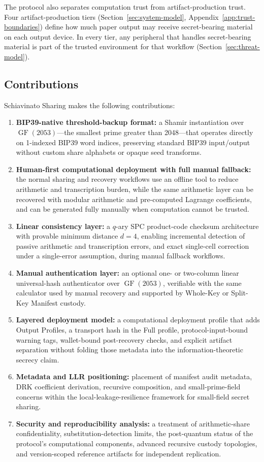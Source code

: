 \documentclass[11pt]{article}
\newcommand{\GF}{\operatorname{GF}}
\begin{document}
The protocol also separates computation trust from artifact-production trust. Four artifact-production tiers (Section~\ref{sec:system-model}, Appendix~\ref{app:trust-boundaries}) define how much paper output may receive secret-bearing material on each output device. In every tier, any peripheral that handles secret-bearing material is part of the trusted environment for that workflow (Section~\ref{sec:threat-model}).

\subsection{Contributions}

Schiavinato Sharing makes the following contributions:

\begin{enumerate}[noitemsep]
    \item \textbf{BIP39-native threshold-backup format:} a Shamir instantiation over $\GF(2053)$---the smallest prime greater than 2048---that operates directly on 1-indexed BIP39 word indices, preserving standard BIP39 input/output without custom share alphabets or opaque seed transforms.
    \item \textbf{Human-first computational deployment with full manual fallback:} the normal sharing and recovery workflows use an offline tool to reduce arithmetic and transcription burden, while the same arithmetic layer can be recovered with modular arithmetic and pre-computed Lagrange coefficients, and can be generated fully manually when computation cannot be trusted.
    \item \textbf{Linear consistency layer:} a $q$-ary SPC product-code checksum architecture with provable minimum distance $d = 4$, enabling incremental detection of passive arithmetic and transcription errors, and exact single-cell correction under a single-error assumption, during manual fallback workflows.
    \item \textbf{Manual authentication layer:} an optional one- or two-column linear universal-hash authenticator over $\GF(2053)$, verifiable with the same calculator used by manual recovery and supported by Whole-Key or Split-Key Manifest custody.
    \item \textbf{Layered deployment model:} a computational deployment profile that adds Output Profiles, a transport hash in the Full profile, protocol-input-bound warning tags, wallet-bound post-recovery checks, and explicit artifact separation without folding those metadata into the information-theoretic secrecy claim.
    \item \textbf{Metadata and LLR positioning:} placement of manifest audit metadata, DRK coefficient derivation, recursive composition, and small-prime-field concerns within the local-leakage-resilience framework for small-field secret sharing.
    \item \textbf{Security and reproducibility analysis:} a treatment of arithmetic-share confidentiality, substitution-detection limits, the post-quantum status of the protocol's computational components, advanced recursive custody topologies, and version-scoped reference artifacts for independent replication.
\end{enumerate}
\end{document}
